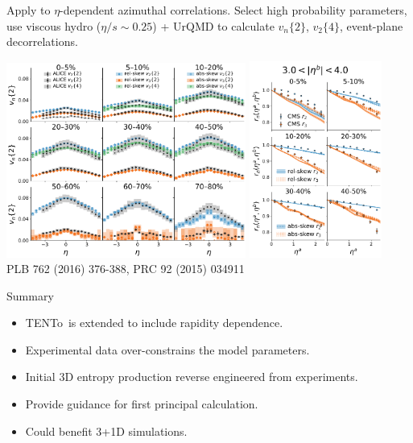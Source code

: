 \documentclass[11pt]{beamer}
\newcommand{\TRENTo}{T\raisebox{-0.2em}{R}ENTo~}
\begin{document}
\begin{frame}{Apply to $\eta$-dependent azimuthal correlations.}
Select high probability parameters, use viscous hydro ($\eta/s \sim 0.25$) + UrQMD to calculate $v_n\{2\}$, $v_2\{4\}$, event-plane decorrelations.
\begin{center}
\includegraphics[width=0.59\textwidth]{vn_eta.pdf}\quad
\includegraphics[width=0.325\textwidth]{evt_pln_decorr_near.pdf}\\
\tiny PLB 762 (2016) 376-388, PRC 92 (2015) 034911
\end{center}
\end{frame}

\begin{frame}{Summary}
\begin{itemize}
\item \TRENTo is extended to include rapidity dependence.
\vspace*{0.5cm}
\item Experimental data over-constrains the model parameters.
\vspace*{0.5cm}
\item \colorbox{red!20}{Initial 3D entropy production reverse engineered
 from experiments.}
\vspace*{0.5cm}
\item \colorbox{blue!20}{Provide guidance for first principal calculation.}
\vspace*{0.5cm}
\item \colorbox{blue!20}{Could benefit 3+1D simulations.}
\end{itemize}
\end{frame}
\end{document}
